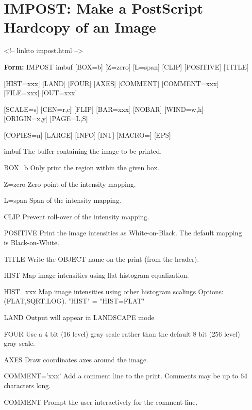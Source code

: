\section{IMPOST: Make a PostScript Hardcopy of an Image}
\begin{rawhtml}
<!-- linkto impost.html -->
\end{rawhtml}
\begin{command}
  \item[\textbf{Form: } IMPOST imbuf {[BOX=b]} {[Z=zero]} {[L=span]} {[CLIP]} 
       {[POSITIVE]} {[TITLE]}\hfill]{}
  \item[{[HIST=xxx]} {[LAND]} {[FOUR]} {[AXES]} {[COMMENT]} {[COMMENT=xxx]}
        {[FILE=xxx]} {[OUT=xxx]}]{}
  \item[{[SCALE=s]} {[CEN=r,c]} {[FLIP]} {[BAR=xxx]} {[NOBAR]} {[WIND=w,h]} 
        {[ORIGIN=x,y]} {[PAGE=L,S]}]{}
  \item[{[COPIES=n]} {[LARGE]} {[INFO]} {[INT]} {[MACRO=]} {[EPS]}]{}
  \item[imbuf]{The buffer containing the image to be printed.}
  \item[BOX=b]{Only print the region within the given box.}
  \item[Z=zero ]{Zero point of the intensity mapping.}
  \item[L=span ]{Span of the intensity mapping.  }
  \item[CLIP]{Prevent roll-over of the intensity mapping.}
  \item[POSITIVE ]{Print the image intensities as White-on-Black.
                   The default mapping is Black-on-White.}
  \item[TITLE ]{Write the OBJECT name on the print (from the header).}
  \item[HIST ]{Map image intensities using flat histogram equalization.}
  \item[HIST=xxx]{Map image intensities using other histogram scalings
                  Options: (FLAT,SQRT,LOG).  "HIST" = "HIST=FLAT"}
  \item[LAND ]{Output will appear in LANDSCAPE mode}
  \item[FOUR ]{Use a 4 bit (16 level) gray scale rather than the
               default 8 bit (256 level) gray scale.}
  \item[AXES ]{Draw coordinates axes around the image.}
  \item[COMMENT='xxx']{Add a comment line to the print.  Comments may be
                       up to 64 characters long. }
  \item[COMMENT ]{Prompt the user interactively for the comment line.}

\end{command}
